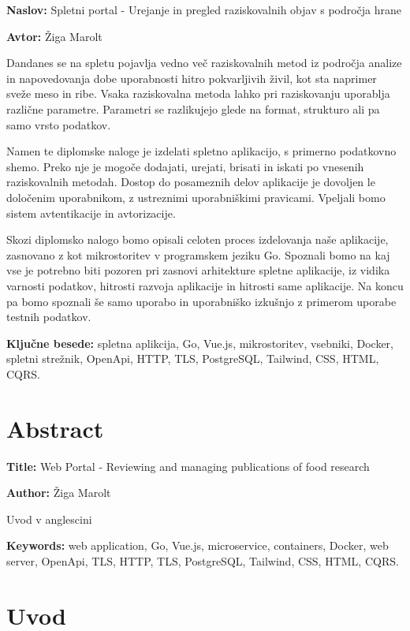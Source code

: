 \documentclass[a4paper, 12pt]{book}
\newcommand{\ttitle}{Spletni portal - Urejanje in pregled raziskovalnih objav s področja hrane}
\newcommand{\ttitleEn}{Web Portal -  Reviewing and managing publications of food research }
\newcommand{\tauthor}{Žiga Marolt}
\newcommand{\tkeywords}{spletna aplikcija, Go, Vue.js, mikrostoritev, vsebniki, Docker, spletni strežnik, OpenApi, HTTP, TLS, PostgreSQL, Tailwind, CSS, HTML, CQRS}
\newcommand{\tkeywordsEn}{web application, Go, Vue.js, microservice, containers, Docker, web server, OpenApi, TLS, HTTP, TLS, PostgreSQL, Tailwind, CSS, HTML, CQRS}
\newcommand{\clearemptydoublepage}{\newpage{\pagestyle{empty}\cleardoublepage}}
\begin{document}
\noindent\textbf{Naslov:} \ttitle
\bigskip

\noindent\textbf{Avtor:} \tauthor
\bigskip

\noindent
Dandanes se na spletu pojavlja vedno več raziskovalnih metod iz področja analize in napovedovanja dobe uporabnosti hitro pokvarljivih živil, kot sta naprimer sveže meso in ribe. Vsaka raziskovalna metoda lahko pri raziskovanju uporablja različne parametre. Parametri se razlikujejo glede na format, strukturo ali pa samo vrsto podatkov. 

Namen te diplomske naloge je izdelati spletno aplikacijo, s primerno podatkovno shemo. Preko nje je mogoče dodajati, urejati, brisati in iskati po vnesenih raziskovalnih metodah. Dostop do posameznih delov aplikacije je dovoljen le določenim uporabnikom, z ustreznimi uporabniškimi pravicami. Vpeljali bomo sistem avtentikacije in avtorizacije.

Skozi diplomsko nalogo bomo opisali celoten proces izdelovanja naše aplikacije, zasnovano z kot mikrostoritev v programskem jeziku Go. Spoznali bomo na kaj vse je potrebno biti pozoren pri zasnovi arhitekture spletne aplikacije, iz vidika varnosti podatkov, hitrosti razvoja aplikacije in hitrosti same aplikacije. Na koncu pa bomo spoznali še samo uporabo in uporabniško izkušnjo z primerom uporabe testnih podatkov.
\bigskip

\noindent\textbf{Ključne besede:} \tkeywords.
\clearemptydoublepage

\chapter*{Abstract}

\noindent\textbf{Title:} \ttitleEn
\bigskip

\noindent\textbf{Author:} \tauthor
\bigskip

\noindent
Uvod v anglescini
\bigskip

\noindent\textbf{Keywords:} \tkeywordsEn.
\clearemptydoublepage

\mainmatter
\setcounter{page}{1}
\pagestyle{fancy}

\chapter{Uvod}
\end{document}
